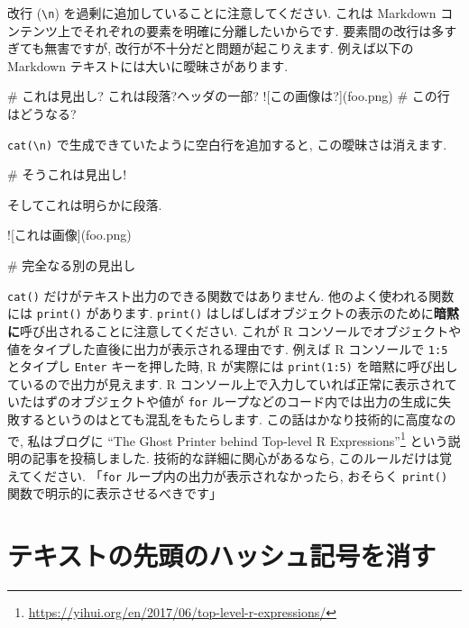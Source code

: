 \documentclass[
  11pt,
]{bxjsreport}
\newenvironment{Shaded}{\begin{snugshade}}{\end{snugshade}}
\newcommand{\AlertTok}[1]{\textcolor[rgb]{0.94,0.16,0.16}{#1}}
\newcommand{\FunctionTok}[1]{\textcolor[rgb]{0.00,0.00,0.00}{#1}}
\newcommand{\NormalTok}[1]{#1}
\renewcommand{\href}[2]{#2\footnote{\url{#1}}}
\begin{document}
改行 (\texttt{\textbackslash{}n}) を過剰に追加していることに注意してください. これは Markdown コンテンツ上でそれぞれの要素を明確に分離したいからです. 要素間の改行は多すぎても無害ですが, 改行が不十分だと問題が起こりえます. 例えば以下の Markdown テキストには大いに曖昧さがあります.

\begin{Shaded}
\begin{Highlighting}[]
\FunctionTok{\# これは見出し?}
\NormalTok{これは段落?ヘッダの一部?}
\AlertTok{![この画像は?](foo.png)}
\FunctionTok{\# この行はどうなる?}
\end{Highlighting}
\end{Shaded}

\texttt{cat(\textquotesingle{}\textbackslash{}n\textquotesingle{})} で生成できていたように空白行を追加すると, この曖昧さは消えます.

\begin{Shaded}
\begin{Highlighting}[]
\FunctionTok{\# そうこれは見出し!}

\NormalTok{そしてこれは明らかに段落.}

\AlertTok{![これは画像](foo.png)}

\FunctionTok{\# 完全なる別の見出し}
\end{Highlighting}
\end{Shaded}

\texttt{cat()} だけがテキスト出力のできる関数ではありません. 他のよく使われる関数には \texttt{print()} があります. \texttt{print()} はしばしばオブジェクトの表示のために\textbf{暗黙に}呼び出されることに注意してください. これが R コンソールでオブジェクトや値をタイプした直後に出力が表示される理由です. 例えば R コンソールで \texttt{1:5} とタイプし \texttt{Enter} キーを押した時, R が実際には \texttt{print(1:5)} を暗黙に呼び出しているので出力が見えます. R コンソール上で入力していれば正常に表示されていたはずのオブジェクトや値が \texttt{for} ループなどのコード内では出力の生成に失敗するというのはとても混乱をもたらします. この話はかなり技術的に高度なので, 私はブログに \href{https://yihui.org/en/2017/06/top-level-r-expressions/}{``The Ghost Printer behind Top-level R Expressions''} という説明の記事を投稿しました. 技術的な詳細に関心があるなら, このルールだけは覚えてください. 「\texttt{for} ループ内の出力が表示されなかったら, おそらく \texttt{print()} 関数で明示的に表示させるべきです」

\hypertarget{opts-comment}{%
\section{テキストの先頭のハッシュ記号を消す}\label{opts-comment}}
\end{document}
